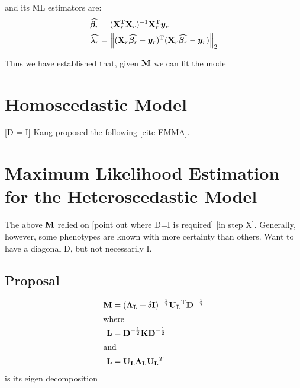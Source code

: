 and its ML estimators are:
\begin{align}
    \widehat{\boldsymbol{\beta}_r}    &= (\mathbf{X}_r ^\mathrm{T} \mathbf{X}_r) ^{-1} \mathbf{X}_r ^\mathrm{T} \bm{y}_r\\
    \widehat{\lambda_r}   &= \left\lVert(\mathbf{X}_r \widehat{\boldsymbol{\beta}_r} - \bm{y}_r)^\mathrm{T}(\mathbf{X}_r \widehat{\boldsymbol{\beta}_r} - \bm{y}_r)\right\rVert_{2}
\end{align}






Thus we have established that, given $\mathbf{M}$ we can fit the model


\section{Homoscedastic Model}

[D = I]
Kang proposed the following [cite EMMA].




\section{Maximum Likelihood Estimation for the Heteroscedastic Model}

The above $\mathbf{M}$ relied on [point out where D=I is required] [in step X].
Generally, however, some phenotypes are known with more certainty than others.
Want to have a diagonal D, but not necessarily I.

\subsection{Proposal}

\begin{align}
	\mathbf{M} &= (\mathbf{\Lambda_L} + \delta \mathbf{I})^{-\frac{1}{2}}\mathbf{U_L}^\mathrm{T} \mathbf{D}^{-\frac{1}{2}}\\
\intertext{where}
	\mathbf{L} &= \mathbf{D}^{-\frac{1}{2}}\mathbf{K} \mathbf{D}^{-\frac{1}{2}}\\
\intertext{and}
	\mathbf{L} &= \mathbf{U_L} \mathbf{\Lambda_L} \mathbf{U_L}^T
\end{align}
is its eigen decomposition


